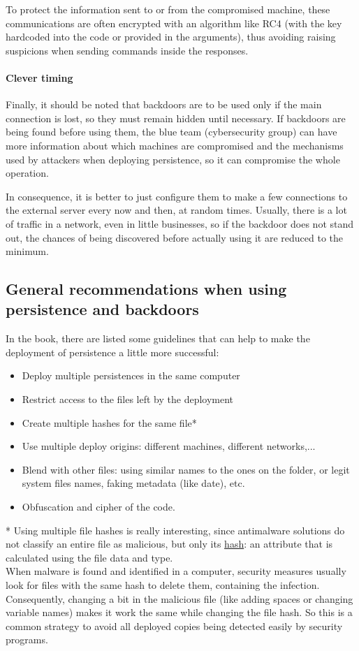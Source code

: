 To protect the information sent to or from the compromised machine, these communications are often encrypted with an algorithm like RC4 (with the key hardcoded into the code or provided in the arguments), thus avoiding raising suspicions when sending commands inside the responses.

\paragraph{Clever timing}
Finally, it should be noted that backdoors are to be used only if the main connection is lost, so they must remain hidden until necessary. If backdoors are being found before using them, the blue team (cybersecurity group) can have more information about which machines are compromised and the mechanisms used by attackers when deploying persistence, so it can compromise the whole operation.

In consequence, it is better to just configure them to make a few connections to the external server every now and then, at random times. Usually, there is a lot of traffic in a network, even in little businesses, so if the backdoor does not stand out, the chances of being discovered before actually using it are reduced to the minimum.

\pagebreak
\subsection{General recommendations when using persistence and backdoors}
\label{ssec:persistenceTips}
In the book\cite{RTBook}, there are listed some guidelines that can help to make the deployment of persistence a little more successful: 
\begin{itemize}
\item Deploy multiple persistences in the same computer
\item Restrict access to the files left by the deployment
\item Create multiple hashes for the same file* 
\item Use multiple deploy origins: different machines, different networks,... 
\item Blend with other files: using similar names to the ones on the folder, or legit system files names, faking metadata (like date), etc.
\item Obfuscation and cipher of the code.
\end{itemize}

* Using multiple file hashes is really interesting, since antimalware solutions do not classify an entire file as malicious, but only its \underline{hash}: an attribute that is calculated using the file data and type.\\ 
When malware is found and identified in a computer, security measures usually look for files with the same hash to delete them, containing the infection. Consequently, changing a bit in the malicious file (like adding spaces or changing variable names) makes it work the same while changing the file hash. So this is a common strategy to avoid all deployed copies being detected easily by security programs.\\

